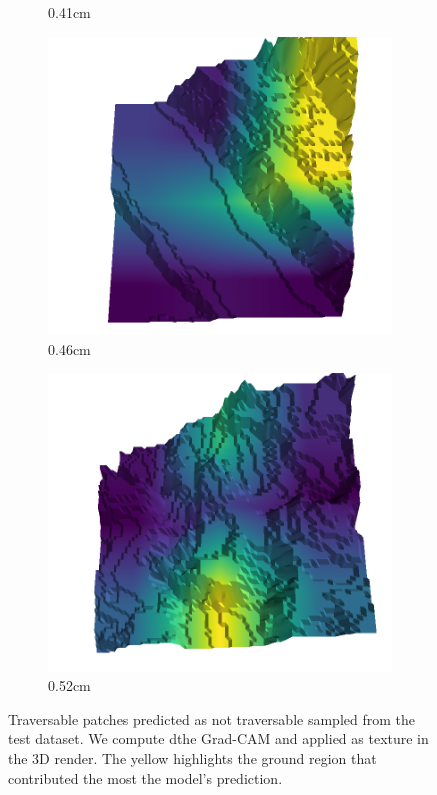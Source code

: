 \documentclass[../document.tex]{subfiles}
\begin{document}
\begin{figure}[H]
\begin{subfigure}[b]{0.192\linewidth}
    \caption{0.41cm}
    \label{fig : false_positive-18}
    \end{subfigure}
    \begin{subfigure}[b]{0.192\linewidth}
    \includegraphics[width=\linewidth]{../img/5/quarry/false_positive/46-patch-3d-majavi-colormap-216.png}
    \caption{0.46cm}
    \label{fig : false_positive-19}
    \end{subfigure}
    \begin{subfigure}[b]{0.192\linewidth}
    \includegraphics[width=\linewidth]{../img/5/quarry/false_positive/51-patch-3d-majavi-colormap-228.png}
    \caption{0.52cm}
    \label{fig : false_positive-20}
    \end{subfigure}
    \label{fig : false_positive}
    \caption{Traversable patches predicted as not traversable sampled from the test dataset. We compute dthe Grad-CAM and applied as texture in the 3D render. The yellow highlights the ground region that contributed the most the model's prediction. }
    \end{figure}
\end{document}
